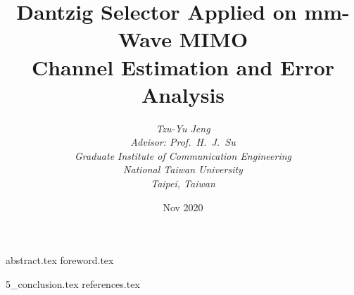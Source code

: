 \documentclass [a4paper, 12pt, twoside, openright] {book}
\begin{document}
\title{
   \textbf {Dantzig Selector Applied on mm-Wave MIMO} \\ \bigskip
   \textbf {Channel Estimation and Error Analysis}
}


\author{
   {\it Tzu-Yu Jeng} \\ \bigskip
   {\it Advisor: Prof.\ H.\ J.\ Su} \\ \bigskip
   {\it Graduate Institute of Communication Engineering} \\ \bigskip
   {\it National Taiwan University} \\ \bigskip
   {\it Taipei, Taiwan}
}

{\date{Nov 2020}}

\maketitle

\frontmatter
 {abstract.tex}
 {foreword.tex}
\tableofcontents
\listoffigures
\listoftables


\mainmatter

 {5_conclusion.tex}
 {references.tex}
\end{document}
